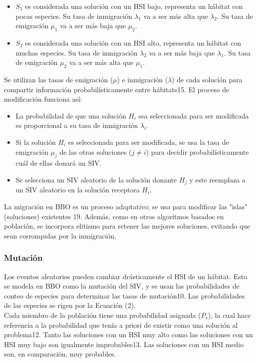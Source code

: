 \documentclass{article}
\begin{document}
\begin{itemize}
    \item $S_1$ es considerada una solución con un HSI bajo, representa un hábitat con pocas especies. Su tasa de inmigración $\lambda_1$ va a ser más alta que $\lambda_2$. Su tasa de emigración $\mu_1$ va a ser más baja que $\mu_2$.
    \item $S_2$ es considerada una solución con un HSI alto, representa un hábitat con muchas especies. Su tasa de inmigración $\lambda_2$ va a ser más baja que $\lambda_1$. Su tasa de emigración $\mu_2$ va a ser más alta que $\mu_1$.
\end{itemize}
Se utilizan las tasas de emigración ($\mu$) e inmigración ($\lambda$) de cada solución para compartir información probabilísticamente entre hábitats15. El proceso de modificación funciona así:
\begin{itemize}
    \item La probabilidad de que una solución $H_i$ sea seleccionada para ser modificada es proporcional a su tasa de inmigración $\lambda_i$.
    \item Si la solución $H_i$ es seleccionada para ser modificada, se usa la tasa de emigración $\mu_j$ de las otras soluciones ($j \neq i$) para decidir probabilísticamente cuál de ellas donará un SIV.
    \item Se selecciona un SIV aleatorio de la solución donante $H_j$ y este reemplaza a un SIV aleatorio en la solución receptora $H_i$.
\end{itemize}
La migración en BBO es un proceso adaptativo; se usa para modificar las "islas" (soluciones) existentes 19. Además, como en otros algoritmos basados en población, se incorpora elitismo para retener las mejores soluciones, evitando que sean corrompidas por la inmigración.


\subsubsection{Mutación} \label{sec:mutation}Los eventos aleatorios pueden cambiar drásticamente el HSI de un hábitat. Esto se modela en BBO como la mutación del SIV, y se usan las probabilidades de conteo de especies para determinar las tasas de mutación10. Las probabilidades de las especies se rigen por la Ecuación (2).\\

Cada miembro de la población tiene una probabilidad asignada ($P_s$), la cual hace referencia a la probabilidad que tenía a priori de existir como una solución al problema12. Tanto las soluciones con un HSI muy alto como las soluciones con un HSI muy bajo son igualmente improbables13. Las soluciones con un HSI medio son, en comparación, muy probables.\\
\end{document}
